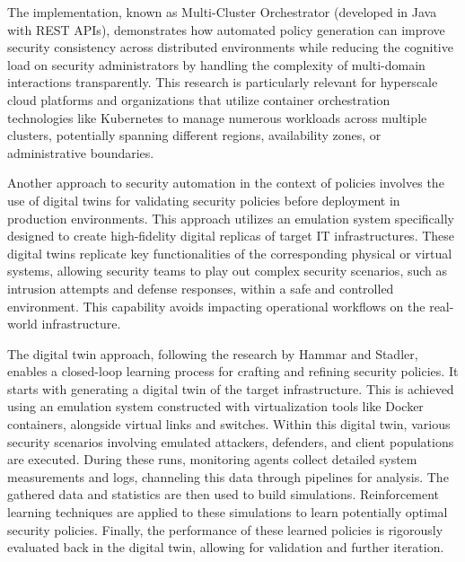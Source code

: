 The implementation, known as Multi-Cluster Orchestrator (developed in Java with REST APIs), demonstrates how automated policy generation can improve security consistency across distributed environments while reducing the cognitive load on security administrators by handling the complexity of multi-domain interactions transparently\cite{bringhenti_security_2023}. This research is particularly relevant for hyperscale cloud platforms and organizations that utilize container orchestration technologies like Kubernetes to manage numerous workloads across multiple clusters, potentially spanning different regions, availability zones, or administrative boundaries\cite{bringhenti_security_2023}.

Another approach to security automation in the context of policies involves the use of digital twins for validating security policies before deployment in production environments\cite{hammar_digital_2023}. This approach utilizes an emulation system specifically designed to create high-fidelity digital replicas of target IT infrastructures\cite{hammar_digital_2023}. These digital twins replicate key functionalities of the corresponding physical or virtual systems, allowing security teams to play out complex security scenarios, such as intrusion attempts and defense responses, within a safe and controlled environment\cite{hammar_digital_2023}. This capability avoids impacting operational workflows on the real-world infrastructure\cite{hammar_digital_2023}.

The digital twin approach, following the research by Hammar and Stadler, enables a closed-loop learning process for crafting and refining security policies\cite{hammar_digital_2023}. It starts with generating a digital twin of the target infrastructure. This is achieved using an emulation system constructed with virtualization tools like Docker containers, alongside virtual links and switches\cite{hammar_digital_2023}. Within this digital twin, various security scenarios involving emulated attackers, defenders, and client populations are executed\cite{hammar_digital_2023}. During these runs, monitoring agents collect detailed system measurements and logs, channeling this data through pipelines for analysis\cite{hammar_digital_2023}. The gathered data and statistics are then used to build simulations\cite{hammar_digital_2023}. Reinforcement learning techniques are applied to these simulations to learn potentially optimal security policies\cite{hammar_digital_2023}. Finally, the performance of these learned policies is rigorously evaluated back in the digital twin, allowing for validation and further iteration\cite{hammar_digital_2023}.

